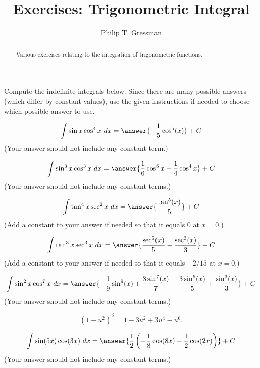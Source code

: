 \documentclass{ximera}
\title{Exercises: Trigonometric Integral}
\author{Philip T. Gressman}
\begin{document}
\begin{abstract}
Various exercises relating to the integration of trigonometric functions.
\end{abstract}
\maketitle


Compute the indefinite integrals below. Since there are many possible answers (which differ by constant values), use the given instructions if needed to choose which possible answer to use.

\begin{exercise}%
\[  \int \sin x\cos^4x\ dx = \answer{-\frac{1}{5} \cos ^5(x)}+C\]
(Your answer should not include any constant term.)
%
%
\end{exercise}

\begin{exercise}%
\[ \int \sin^3 x\cos^3 x\ dx = \answer{\frac{1}{6}\cos^6x-\frac{1}{4}\cos^4x}+C\]
(Your answer should not include any constant terms.)
%
%
\end{exercise}

\begin{exercise}%
\[ \int \tan^4x\sec^2x\ dx = \answer{\frac{\tan ^5(x)}{5}}+ C\]
(Add a constant to your answer if needed so that it equals $0$ at $x = 0$.)
%
%
\end{exercise}

\begin{exercise}%
\[ \int \tan^3x\sec^3x\ dx = \answer{\frac{\sec ^5(x)}{5}-\frac{\sec ^3(x)}{3}}+ C\]
(Add a constant to your answer if needed so that it equals $-2/15$ at $x = 0$.)
%
%
\end{exercise}

\begin{exercise}%
\[ \int \sin^2 x\cos^7 x\ dx = \answer{-\frac{1}{9} \sin ^{9}(x)+\frac{3 \sin^7(x)}{7}-\frac{3\sin ^5(x)}{5}+\frac{\sin ^3(x)}{3}}+ C\]
(Your answer should not include any constant terms.)
\begin{hint}
\[ (1-u^2)^3 = 1 - 3 u^2 + 3 u^4 - u^6. \]
\end{hint}
%
%
\end{exercise}

\begin{exercise}%
\[ \int \sin(5x)\cos(3x)\ dx = \answer{\frac{1}{2}\left(-\frac{1}{8}\cos(8x)-\frac{1}{2}\cos(2x)\right)}+ C\]
(Your answer should not include any constant terms.)
%
%
\end{exercise}
\end{document}

